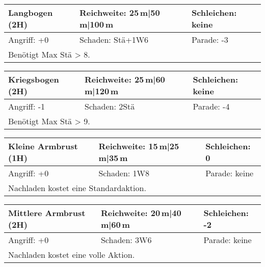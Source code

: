 \documentclass[../../Heldenanleitung2]{subfiles}
\begin{document}
\begin{tabular}{|p{}|p{}|p{}|}
\hline
\textbf{Langbogen (2H)} & Reichweite: 25\,m|50\,m|100\,m & Schleichen: keine\\
\hline
Angriff: +0 & Schaden: Stä+1W6 & Parade: -3\\
\hline
\multicolumn{3}{|p{0.99\textwidth}|}{Benötigt Max Stä > 8.} \\
\hline
\end{tabular}
\newline \newline\newline
\begin{tabular}{|p{}|p{}|p{}|}
\hline
\textbf{Kriegsbogen (2H)} & Reichweite: 25\,m|60\,m|120\,m & Schleichen: keine\\
\hline
Angriff: -1 & Schaden: 2Stä & Parade: -4 \\
\hline
\multicolumn{3}{|p{0.99\textwidth}|}{Benötigt Max Stä > 9.} \\
\hline
\end{tabular}
\newline \newline\newline
\begin{tabular}{|p{}|p{}|p{}|}
\hline
\textbf{Kleine Armbrust (1H)} & Reichweite: 15\,m|25\,m|35\,m & Schleichen: 0 \\
\hline
Angriff: +0 & Schaden: 1W8 & Parade: keine\\
\hline
\multicolumn{3}{|p{0.99\textwidth}|}{Nachladen kostet eine Standardaktion.} \\
\hline
\end{tabular}
\newline \newline\newline
\begin{tabular}{|p{}|p{}|p{}|}
\hline
\textbf{Mittlere Armbrust (2H)} & Reichweite: 20\,m|40\,m|60\,m & Schleichen: -2\\
\hline
Angriff: +0 & Schaden: 3W6 & Parade: keine\\
\hline
\multicolumn{3}{|p{0.99\textwidth}|}{Nachladen kostet eine volle Aktion.} \\
\hline
\end{tabular}
\newline \newline\newline
\end{document}
